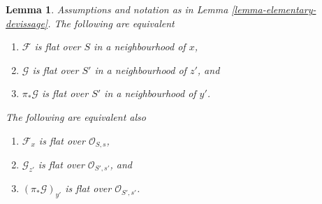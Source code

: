 \documentclass[10pt,a4paper]{amsart}
\theoremstyle{plain}
\newtheorem{lemma}[subsection]{Lemma}
\theoremstyle{definition}
\theoremstyle{remark}
\numberwithin{equation}{subsection}
\begin{document}
\begin{lemma}
\label{lemma-devissage-flat}
Assumptions and notation as in
Lemma \ref{lemma-elementary-devissage}.
The following are equivalent
\begin{enumerate}
\item $\mathcal{F}$ is flat over $S$ in a neighbourhood of $x$,
\item $\mathcal{G}$ is flat over $S'$ in a neighbourhood of $z'$, and
\item $\pi_*\mathcal{G}$ is flat over $S'$ in a neighbourhood of $y'$.
\end{enumerate}
The following are equivalent also
\begin{enumerate}
\item[(a)] $\mathcal{F}_x$ is flat over $\mathcal{O}_{S, s}$,
\item[(b)] $\mathcal{G}_{z'}$ is flat over $\mathcal{O}_{S', s'}$, and
\item[(c)] $(\pi_*\mathcal{G})_{y'}$ is flat over $\mathcal{O}_{S', s'}$.
\end{enumerate}
\end{lemma}
\end{document}
